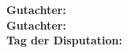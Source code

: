 \newpage  %


\vspace*{\fill}  %
\begin{flushleft}
	\large
    \textbf{Gutachter:}   \\[0.2cm]
    \textbf{Gutachter:}   \\[0.2cm]
    \textbf{Tag der Disputation:} 
\end{flushleft}

\newpage  %